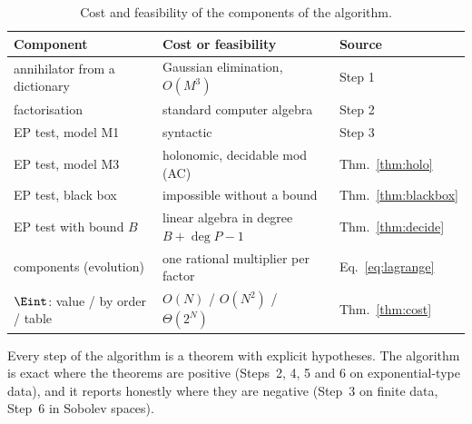 \begin{table}[!htb]
\centering\small
\begin{tabular}{@{}L{4.6cm}L{5.6cm}L{3.6cm}@{}}
\toprule
Component & Cost or feasibility & Source\\\midrule
annihilator from a dictionary & Gaussian elimination, $O(M^3)$ & Step 1\\
factorisation & standard computer algebra & Step 2\\
EP test, model M1 & syntactic & Step 3\\
EP test, model M3 & holonomic, decidable mod (AC) & Thm.~\ref{thm:holo}\\
EP test, black box & impossible without a bound & Thm.~\ref{thm:blackbox}\\
EP test with bound $B$ & linear algebra in degree $B+\deg P-1$ & Thm.~\ref{thm:decide}\\
components (evolution) & one rational multiplier per factor & Eq.~\eqref{eq:lagrange}\\
$\Eint$: value / by order / table & $O(N)$ / $O(N^2)$ / $\Theta(2^N)$ & Thm.~\ref{thm:cost}\\
\bottomrule
\end{tabular}
\caption{Cost and feasibility of the components of the algorithm.}\label{tab:complexity}
\end{table}

\begin{keypoint}
Every step of the algorithm is a theorem with explicit hypotheses. The algorithm is exact where the theorems are positive (Steps~2, 4, 5 and 6 on exponential-type data), and it reports honestly where they are negative (Step~3 on finite data, Step~6 in Sobolev spaces).
\end{keypoint}
